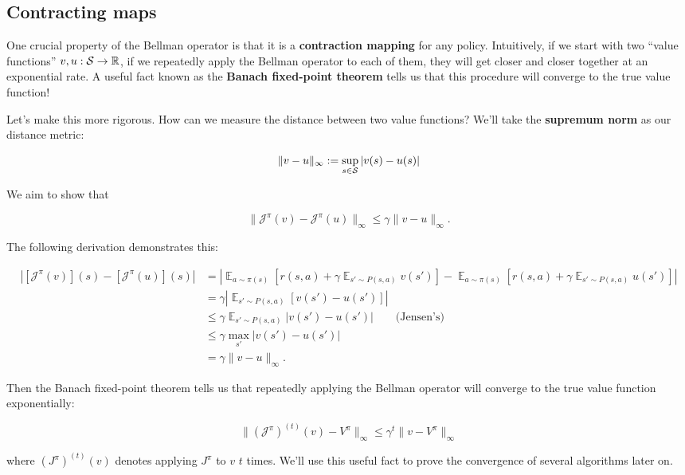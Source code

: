 \documentclass[../main/main]{subfiles}
\begin{document}
\subsection{Contracting maps}

One crucial property of the Bellman operator is that it is a \textbf{contraction mapping} for any policy. Intuitively, if we start with two ``value functions'' $v, u : \S \to \R$, if we repeatedly apply the Bellman operator to each of them, they will get closer and closer together at an exponential rate. A useful fact known as the \textbf{Banach fixed-point theorem} tells us that this procedure will converge to the true value function!

Let's make this more rigorous. How can we measure the distance between two value functions? We'll take the \textbf{supremum norm} as our distance metric:

\[
    \| v - u \|_{\infty} := \sup_{s \in \S} |v(s) - u(s)|
\]

We aim to show that

\[\|\mathcal{J}^{\pi} (v) - \mathcal{J}^{\pi} (u) \|_{\infty} \le \gamma \|v - u \|_{\infty}.\]

The following derivation demonstrates this:

\begin{align*}
|[\mathcal{J}^{\pi} (v)](s) - [\mathcal{J}^{\pi} (u)](s)|&= \left| \mathop{\mathbb{E}}_{a \sim \pi(s)} \left[ r(s, a) + \gamma \mathop{\mathbb{E}}_{s' \sim P(s, a)} v(s') \right] - \mathop{\mathbb{E}}_{a \sim \pi(s)} \left[r(s, a) + \gamma \mathop{\mathbb{E}}_{s' \sim P(s, a)} u(s') \right] \right| \\
&= \gamma \left|\mathop{\mathbb{E}}_{s' \sim P(s, a)} [v(s') - u(s')] \right| \\
&\le \gamma \mathop{\mathbb{E}}_{s' \sim P(s, a)}|v(s') - u(s')| \qquad \text{(Jensen's)} \\
&\le \gamma \max_{s'} |v(s') - u(s')| \\
&= \gamma \|v - u \|_{\infty}.
\end{align*}

Then the Banach fixed-point theorem tells us that repeatedly applying the Bellman operator will converge to the true value function exponentially:

\[ \|(\mathcal{J}^\pi)^{(t)}(v) - V^\pi \|_{\infty} \le \gamma^{t} \| v - V^\pi\|_{\infty} \]

where $(J^\pi)^{(t)}(v)$ denotes applying $J^\pi$ to $v$ $t$ times. We'll use this useful fact to prove the convergence of several algorithms later on.
\end{document}
